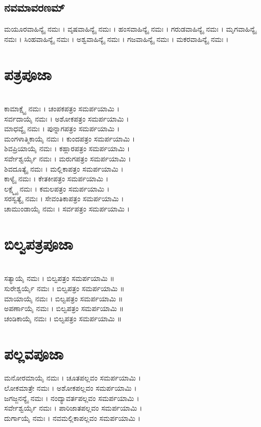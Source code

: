 \subsection{ನವಮಾವರಣಮ್}
ಮಯೂರವಾಹಿನ್ಯೈ  ನಮಃ ।
ವೃಷವಾಹಿನ್ಯೈ  ನಮಃ ।
ಹಂಸವಾಹಿನ್ಯೈ  ನಮಃ ।
ಗರುಡವಾಹಿನ್ಯೈ  ನಮಃ ।
ಮೃಗವಾಹಿನ್ಯೈ  ನಮಃ ।
ಸಿಂಹವಾಹಿನ್ಯೈ  ನಮಃ ।
ಅಶ್ವವಾಹಿನ್ಯೈ  ನಮಃ ।
ಗಜವಾಹಿನ್ಯೈ  ನಮಃ ।
ಮಕರವಾಹಿನ್ಯೈ  ನಮಃ ।\\
\section{ಪತ್ರಪೂಜಾ}
\\
ಕಾಮಾಕ್ಷ್ಯೈ ನಮಃ । ಚಂಪಕಪತ್ರಂ ಸಮರ್ಪಯಾಮಿ ।\\
ಸರ್ವದಾಯೈ ನಮಃ । ಅಶೋಕಪತ್ರಂ ಸಮರ್ಪಯಾಮಿ ।\\
ಮಾಧವ್ಯೈ ನಮಃ । ಪುನ್ನಾಗಪತ್ರಂ ಸಮರ್ಪಯಾಮಿ ।\\
ಮಂಗಳಾತ್ಮಿಕಾಯೈ ನಮಃ । ಕುಂದಪತ್ರಂ ಸಮರ್ಪಯಾಮಿ ।\\
ಶಿವಪ್ರಿಯಾಯೈ ನಮಃ । ಕಹ್ಲಾರಪತ್ರಂ ಸಮರ್ಪಯಾಮಿ ।\\
ಸರ್ವೇಶ್ವರ್ಯೈ ನಮಃ । ಮರುಗಪತ್ರಂ ಸಮರ್ಪಯಾಮಿ ।\\
ಶಿವದೂತ್ಯೈ ನಮಃ । ಮಲ್ಲಿಕಾಪತ್ರಂ ಸಮರ್ಪಯಾಮಿ ।\\
ಕಾಳ್ಯೈ ನಮಃ । ಕೇತಕೀಪತ್ರಂ ಸಮರ್ಪಯಾಮಿ ।\\
ಲಕ್ಷ್ಮ್ಯೈ ನಮಃ । ಕಮಲಪತ್ರಂ ಸಮರ್ಪಯಾಮಿ ।\\
ಸರಸ್ವತ್ಯೈ ನಮಃ । ಸೇವಂತಿಕಾಪತ್ರಂ ಸಮರ್ಪಯಾಮಿ ।\\
ಚಾಮುಂಡಾಯೈ ನಮಃ । ಸರ್ವಪತ್ರಂ ಸಮರ್ಪಯಾಮಿ ।

\section{ಬಿಲ್ವಪತ್ರಪೂಜಾ}
\\
ಸತ್ಯಾಯೈ ನಮಃ । ಬಿಲ್ವಪತ್ರಂ ಸಮರ್ಪಯಾಮಿ ॥\\
ಸುರೇಶ್ವರ್ಯೈ ನಮಃ । ಬಿಲ್ವಪತ್ರಂ ಸಮರ್ಪಯಾಮಿ ॥\\
ಮಾಯಾಯೈ ನಮಃ । ಬಿಲ್ವಪತ್ರಂ ಸಮರ್ಪಯಾಮಿ ॥\\
ಅಪರ್ಣಾಯೈ ನಮಃ । ಬಿಲ್ವಪತ್ರಂ ಸಮರ್ಪಯಾಮಿ ॥\\
ಚಂಡಿಕಾಯೈ ನಮಃ । ಬಿಲ್ವಪತ್ರಂ ಸಮರ್ಪಯಾಮಿ ॥

\section{ಪಲ್ಲವಪೂಜಾ}
ಮನೋರಮಾಯೈ ನಮಃ । ಚೂತಪಲ್ಲವಂ ಸಮರ್ಪಯಾಮಿ ।\\
ಲೋಕಮಾತ್ರೇ ನಮಃ । ಅಶೋಕಪಲ್ಲವಂ ಸಮರ್ಪಯಾಮಿ ।\\
ಜಗಜ್ಜನನ್ಯೈ ನಮಃ । ನಂದ್ಯಾವರ್ತಪಲ್ಲವಂ ಸಮರ್ಪಯಾಮಿ ।\\
ಸರ್ವೇಶ್ವರ್ಯೈ ನಮಃ । ಪಾರಿಜಾತಪಲ್ಲವಂ ಸಮರ್ಪಯಾಮಿ ।\\
ದುರ್ಗಾಯೈ ನಮಃ । ನವಮಲ್ಲಿಕಾಪಲ್ಲವಂ ಸಮರ್ಪಯಾಮಿ ।

